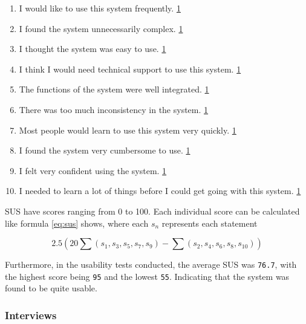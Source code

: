 \begin{enumerate}[label=\textbf{\arabic*.}]
    \item I would like to use this system frequently. \hfill \underline{1    }
    \item I found the system unnecessarily complex. \hfill \underline{1    }
    \item I thought the system was easy to use. \hfill \underline{1    }
    \item I think I would need technical support to use this system. \hfill \underline{1    }
    \item The functions of the system were well integrated. \hfill \underline{1    }
    \item There was too much inconsistency in the system. \hfill \underline{1    }
    \item Most people would learn to use this system very quickly. \hfill \underline{1    }
    \item I found the system very cumbersome to use. \hfill \underline{1    }
    \item I felt very confident using the system. \hfill \underline{1    }
    \item I needed to learn a lot of things before I could get going with this system. \hfill \underline{1    }
\end{enumerate}

SUS have scores ranging from 0 to 100. Each individual score can be calculated like formula \ref{eq:sus} shows, where each $s_n$ represents each statement

\begin{equation}
    2.5 \left(20 \sum(s_1,s_3,s_5,s_7,s_9) - \sum(s_2,s_4,s_6,s_8,s_{10})\right) \label{eq:sus}
\end{equation}

Furthermore, in the usability tests conducted, the average SUS was \verb|76.7|, with the highest score being \verb|95| and the lowest \verb|55|. Indicating that the system was found to be quite usable.


\subsubsection{Interviews}

